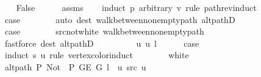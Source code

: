 \begin{isabellebody}
\ \ \isamarkupfalse%
\ False\isanewline
\ \ \ \ \isamarkupfalse%
\ assms\isanewline
\ \ \isamarkupfalse%
\ {\isacharparenleft}{\kern0pt}induct\ p\ arbitrary{\isacharcolon}{\kern0pt}\ v\ rule{\isacharcolon}{\kern0pt}\ path{\isacharunderscore}{\kern0pt}rev{\isacharunderscore}{\kern0pt}induct{\isacharparenright}{\kern0pt}\isanewline
\ \ \ \ \isamarkupfalse%
\ {}\isanewline
\ \ \ \ \isamarkupfalse%
\ {\isacharquery}{\kern0pt}case\isanewline
\ \ \ \ \ \ \isamarkupfalse%
\ {\isacharparenleft}{\kern0pt}auto\ dest{\isacharcolon}{\kern0pt}\ walk{\isacharunderscore}{\kern0pt}between{\isacharunderscore}{\kern0pt}nonempty{\isacharunderscore}{\kern0pt}path{\isacharparenleft}{\kern0pt}{}{\isacharparenright}{\kern0pt}\ alt{\isacharunderscore}{\kern0pt}pathD{\isacharparenleft}{\kern0pt}{}{\isacharparenright}{\kern0pt}{\isacharparenright}{\kern0pt}\isanewline
\ \ \isamarkupfalse%
\isanewline
\ \ \ \ \isamarkupfalse%
\ {}\isanewline
\ \ \ \ \isamarkupfalse%
\ {\isacharquery}{\kern0pt}case\isanewline
\ \ \ \ \ \ \isamarkupfalse%
\ src{\isacharunderscore}{\kern0pt}not{\isacharunderscore}{\kern0pt}white\ walk{\isacharunderscore}{\kern0pt}between{\isacharunderscore}{\kern0pt}nonempty{\isacharunderscore}{\kern0pt}path{\isacharparenleft}{\kern0pt}{}{\isacharcomma}{\kern0pt}\ {}{\isacharparenright}{\kern0pt}\isanewline
\ \ \ \ \ \ \isamarkupfalse%
\ {\isacharparenleft}{\kern0pt}fastforce\ dest{\isacharcolon}{\kern0pt}\ alt{\isacharunderscore}{\kern0pt}pathD{\isacharparenleft}{\kern0pt}{}{\isacharparenright}{\kern0pt}{\isacharparenright}{\kern0pt}\isanewline
\ \ \isamarkupfalse%
\isanewline
\ \ \ \ \isamarkupfalse%
\ {\isacharparenleft}{\kern0pt}{}\ u\ u{\isacharprime}{\kern0pt}\ l{\isacharparenright}{\kern0pt}\isanewline
\ \ \ \ \isamarkupfalse%
\ {\isacharquery}{\kern0pt}case\isanewline
\ \ \ \ \isamarkupfalse%
\ {\isacharparenleft}{\kern0pt}induct\ s\ u\ rule{\isacharcolon}{\kern0pt}\ vertex{\isacharunderscore}{\kern0pt}color{\isacharunderscore}{\kern0pt}induct{\isacharparenright}{\kern0pt}\isanewline
\ \ \ \ \ \ \isamarkupfalse%
\ white\isanewline
\ \ \ \ \ \ \isamarkupfalse%
\ {\isachardoublequoteopen}alt{\isacharunderscore}{\kern0pt}path\ P{\isacharprime}{\kern0pt}{\isacharprime}{\kern0pt}\ {\isacharparenleft}{\kern0pt}Not\ {\isasymcirc}\ P{\isacharprime}{\kern0pt}{\isacharprime}{\kern0pt}{\isacharparenright}{\kern0pt}\ {\isacharparenleft}{\kern0pt}G{\isachardot}{\kern0pt}E\ G{\isacharparenright}{\kern0pt}\ {\isacharparenleft}{\kern0pt}l\ {\isacharat}{\kern0pt}\ {\isacharbrackleft}{\kern0pt}u{\isacharbrackright}{\kern0pt}{\isacharparenright}{\kern0pt}\ src\ u{\isachardoublequoteclose}\isanewline

\end{isabellebody}
